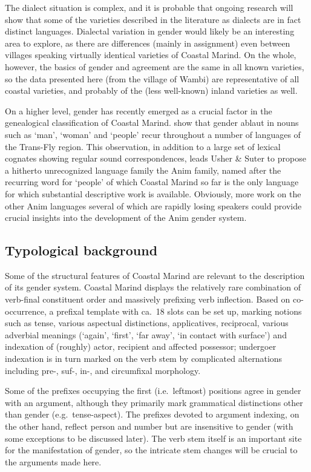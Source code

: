 \documentclass[output=collectionpaper]{langsci/langscibook}
\begin{document}
The dialect situation is complex, and it is probable that ongoing research will show that some of the varieties described in the literature as dialects are in fact distinct languages. Dialectal variation in gender would likely be an interesting area to explore, as there are differences (mainly in assignment) even between villages speaking virtually identical varieties of Coastal Marind. On the whole, however, the basics of gender and agreement are the same in all known varieties, so the data presented here (from the village of Wambi) are representative of all coastal varieties, and probably of the (less well-known) inland varieties as well.

On a higher level, gender has recently emerged as a crucial factor in the genealogical classification of Coastal Marind. \textcite{Usher2015} show that gender ablaut in nouns such as  `man',  `woman' and  `people' recur throughout a number of languages of the Trans-Fly region. This observation, in addition to a large set of lexical cognates showing regular sound correspondences, leads Usher \& Suter to propose a hitherto unrecognized language family \textendash{} the Anim family, named after the recurring word for `people' \textendash{} of which Coastal Marind so far is the only language for which substantial descriptive work is available. Obviously, more work on the other Anim languages \textendash{} several of which are rapidly losing speakers \textendash{} could provide crucial insights into the development of the Anim gender system.

\subsection{Typological background}
\label{sec:Bruno:typology}
Some of the structural features of Coastal Marind are relevant to the description of its gender system. Coastal Marind displays the relatively rare combination of verb-final constituent order and massively prefixing verb inflection. Based on co-occurrence, a prefixal template with ca.~18 slots can be set up, marking notions such as tense, various aspectual distinctions, applicatives, reciprocal, various adverbial meanings (`again', `first', `far away', `in contact with surface') and indexation of (roughly) actor, recipient and affected possessor; undergoer indexation is in turn marked on the verb stem by complicated alternations including pre-, suf-, in-, and circumfixal morphology.

Some of the prefixes occupying the first (i.e.\ leftmost) positions agree in gender with an argument, although they primarily mark grammatical distinctions other than gender (e.g.\ tense-aspect). The prefixes devoted to argument indexing, on the other hand, reflect person and number but are insensitive to gender (with some exceptions to be discussed later). The verb stem itself is an important site for the manifestation of gender, so the intricate stem changes will be crucial to the arguments made here.
\end{document}
